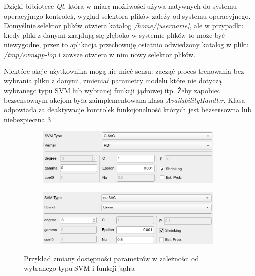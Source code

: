 \documentclass[paper=a4, fontsize=11pt]{scrartcl} %
\numberwithin{equation}{section} %
\numberwithin{figure}{section} %
\begin{document}
    \par Dzięki bibliotece \textit{Qt}, która w miarę możliwości używa natywnych do systemu
    operacyjnego kontrolek, wygląd selektora plików zależy od systemu operacyjnego. Domyślnie
    selektor plików otwiera katalog \textit{/home/[username]}, ale w przypadku kiedy pliki z
    danymi znajdują się głęboko w systemie plików to może być niewygodne, przez to aplikacja
    przechowuję ostatnio odwiedzony katalog w pliku \textit{/tmp/svmapp-lop} i zawsze otwiera w
    nim nowy selektor plików.

    \par Niektóre akcje użytkownika mogą nie mieć sensu: zacząć proces trenowania bez wybrania
    pliku z danymi, zmieniać parametry modelu które nie dotyczą wybranego typu SVM lub
    wybranej funkcji jądrowej itp. Żeby zapobiec bezsensownym akcjom była zaimplementowana
    klasa \textit{AvailabilityHandler}. Klasa odpowiada za deaktywacje kontrolek funkcjonalność
    których jest bezsensowna lub niebezpieczna \ref{fig:availability_ex} 


    \begin{figure}[H]
        \begin{subfigure}{.5\textwidth}
            \centering
            \includegraphics[width=.95\linewidth]{img/svm_app_param_ex1.png}
            \label{fig:availability_ex1}
        \end{subfigure}%
        \begin{subfigure}{.5\textwidth}
            \centering
            \includegraphics[width=.95\linewidth]{img/svm_app_param_ex2.png}
            \label{fig:availability_ex2}
        \end{subfigure}
        \caption{Przykład zmiany dostępności parametrów w zależności od wybranego typu SVM i
        funkcji jądra}
        \label{fig:availability_ex}
    \end{figure}
\end{document}

